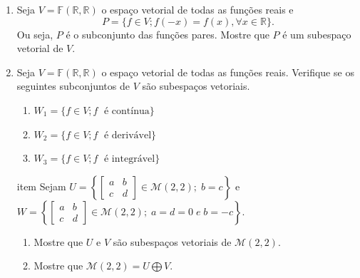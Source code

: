 \begin{enumerate}
\item Seja $V=\mathbb{F}(\mathbb{R}, \mathbb{R})$ o espaço vetorial  de todas as funções reais e $$P=\{f \in V; f(-x)=f(x), \forall  x \in \mathbb{R} \}. $$ Ou seja, $P$ é o subconjunto das funções pares. Mostre que $P$ é um subespaço vetorial de $V$.

\item Seja $V=\mathbb{F}(\mathbb{R}, \mathbb{R})$ o espaço vetorial  de todas as funções reais.  Verifique se os seguintes subconjuntos de $V$ são subespaços vetoriais.
\begin{enumerate}[label=(\alph*)]
\item $W_1 = \{ f \in V; f \; \text{ é contínua}\}$
\item $W_2 = \{ f \in V; f \; \text{ é derivável}\}$
\item $W_3 = \{ f \in V; f \; \text{ é integrável}\}$
\end{enumerate}

item  Sejam $U= \left\{ \left[\begin{array}{cc} a& b\\ c& d\end{array}\right] \in \mathcal{M}(2,2); \; b=c\right\}$ e $W= \left\{ \left[\begin{array}{cc} a& b\\ c& d\end{array}\right] \in \mathcal{M}(2,2); \; a=d=0\; {e} \; b=-c\right\}$.
    \begin{enumerate}
    \item Mostre que $U$ e $V$ são subespaços vetoriais de $ \mathcal{M}(2,2)$.
    \item Mostre que $ \mathcal{M}(2,2)=U \bigoplus V$.
    \end{enumerate}



\end{enumerate}
